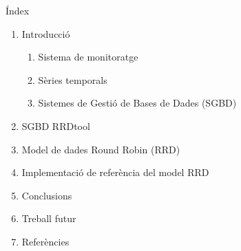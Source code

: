 \begin{frame}{Índex}
  \begin{enumerate}
  
  \item Introducció
    \begin{enumerate}
    \item Sistema de monitoratge
    \item Sèries temporals
    \item Sistemes de Gestió de Bases de Dades (SGBD)
    \end{enumerate}
    
  \item SGBD RRDtool 
    
  \item Model de dades Round Robin (RRD)
    
  \item Implementació de referència del model RRD
    
  \item Conclusions
    
  \item Treball futur
    
  \item Referències
\end{enumerate}
\end{frame}




